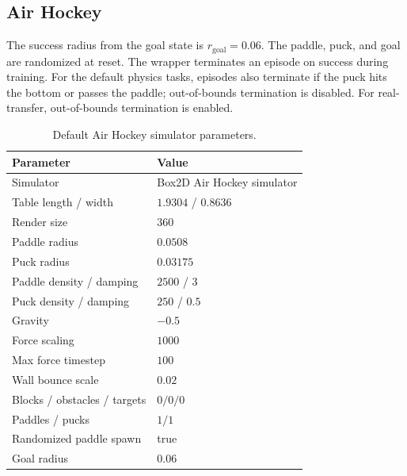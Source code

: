 
\subsection{Air Hockey}

The success radius from the goal state is $r_{\mathrm{goal}} = 0.06$. 
The paddle, puck, and goal are randomized at reset.  The wrapper terminates an
episode on success during training.  For the default physics tasks, episodes
also terminate if the puck hits the bottom or passes the paddle; out-of-bounds
termination is disabled.  For real-transfer, out-of-bounds termination is
enabled.

\begin{table}[h]
\centering
\small
\setlength{\tabcolsep}{5pt}
\caption{Default Air Hockey simulator parameters.}
\label{tab:appendix-air-hockey-default-physics}
\begin{tabular}{ll}
\toprule
Parameter & Value \\
\midrule
Simulator & Box2D Air Hockey simulator \\
Table length / width & $1.9304$ / $0.8636$ \\
Render size & $360$ \\
Paddle radius & $0.0508$ \\
Puck radius & $0.03175$ \\
Paddle density / damping & $2500$ / $3$ \\
Puck density / damping & $250$ / $0.5$ \\
Gravity & $-0.5$ \\
Force scaling & $1000$ \\
Max force timestep & $100$ \\
Wall bounce scale & $0.02$ \\
Blocks / obstacles / targets & $0/0/0$ \\
Paddles / pucks & $1/1$ \\
Randomized paddle spawn & true \\
Goal radius & $0.06$ \\
\bottomrule
\end{tabular}
\end{table}

